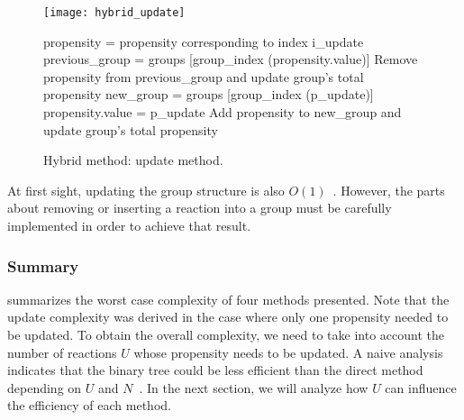 \begin{figure}[!h]
  \centering
  \begin{minipage}{\textwidth}
    \centering
    \texttt{[image: hybrid\_update]}
    \begin{algorithm}[H]
      \SetAlgoLined{}
      \KwData{$K+1$ groups, group k containing propensities
      whose value falls in the interval $(0,b]$ if k=0, $(2^{k-1}b, 2^k b]$ if k $>$ 0.
      Propensities are stored as a couple containing their value and original index.
      Index i\_update of propensity to update, new propensity value p\_update.}
  propensity = propensity corresponding to index i\_update\;
  previous\_group = groups [group\_index (propensity.value)]\;
  Remove propensity from previous\_group and update group's total propensity\;
  new\_group = groups [group\_index (p\_update)]\;
  propensity.value = p\_update\;
  Add propensity to new\_group and update group's total propensity\;
    \end{algorithm}
  \end{minipage}
  \caption{Hybrid method: update method.}
\label{fig:hybrid_update}
\end{figure}

At first sight, updating the group structure is also $O(1)$~. However, the parts about removing or inserting a reaction into a group must be carefully implemented in order to achieve that result.

\subsubsection{Summary}

 summarizes the worst case complexity of four methods presented.
Note that the update complexity was derived in the case where only one propensity needed to be updated.
To obtain the overall complexity, we need to take into account the number of reactions $U$ whose propensity needs to be updated.
A naive analysis indicates that the binary tree could be less efficient
than the direct method depending on $U$ and $N$~.
In the next section, we will analyze how $U$ can influence the efficiency of each method.

